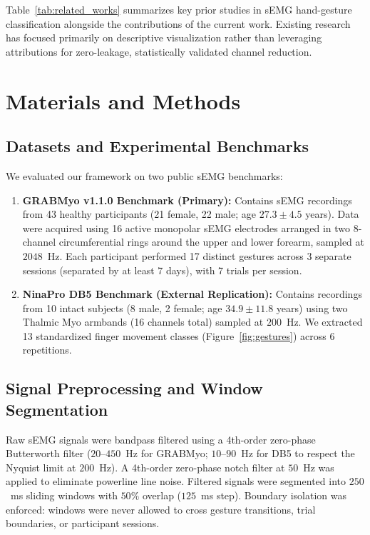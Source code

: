 \documentclass[10pt,twocolumn,letterpaper]{article}
\begin{document}
Table~\ref{tab:related_works} summarizes key prior studies in sEMG hand-gesture classification alongside the contributions of the current work. Existing research has focused primarily on descriptive visualization rather than leveraging attributions for zero-leakage, statistically validated channel reduction.

\section{Materials and Methods}

\subsection{Datasets and Experimental Benchmarks}
We evaluated our framework on two public sEMG benchmarks:
\begin{enumerate}
    \item \textbf{GRABMyo v1.1.0 Benchmark (Primary):} Contains sEMG recordings from 43 healthy participants (21 female, 22 male; age $27.3 \pm 4.5$ years). Data were acquired using 16 active monopolar sEMG electrodes arranged in two 8-channel circumferential rings around the upper and lower forearm, sampled at $2048$~Hz. Each participant performed 17 distinct gestures across 3 separate sessions (separated by at least 7 days), with 7 trials per session.
    \item \textbf{NinaPro DB5 Benchmark (External Replication):} Contains recordings from 10 intact subjects (8 male, 2 female; age $34.9 \pm 11.8$ years) using two Thalmic Myo armbands (16 channels total) sampled at $200$~Hz. We extracted 13 standardized finger movement classes (Figure~\ref{fig:gestures}) across 6 repetitions.
\end{enumerate}

\subsection{Signal Preprocessing and Window Segmentation}
Raw sEMG signals were bandpass filtered using a 4th-order zero-phase Butterworth filter ($20$--$450$~Hz for GRABMyo; $10$--$90$~Hz for DB5 to respect the Nyquist limit at $200$~Hz). A 4th-order zero-phase notch filter at $50$~Hz was applied to eliminate powerline line noise. Filtered signals were segmented into $250$~ms sliding windows with $50\%$ overlap ($125$~ms step). Boundary isolation was enforced: windows were never allowed to cross gesture transitions, trial boundaries, or participant sessions.
\end{document}
